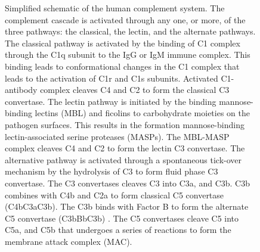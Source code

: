 \documentclass[12pt]{article}
\begin{document}
\begin{figure}[h]
\caption{Simplified schematic of the human complement system. The complement cascade is activated through any one, or more, of the three pathways:  the classical, the lectin, and the alternate pathways. The classical pathway is activated by the binding of C1 complex through the C1q subunit to the IgG or IgM immune complex.  This binding leads to conformational changes in the C1 complex that leads to the activation of C1r and C1s subunits. Activated C1-antibody complex cleaves C4 and C2 to form the classical C3 convertase. The lectin pathway is initiated by the binding mannose-binding lectins (MBL) and ficolins to carbohydrate moieties on the pathogen surfaces. This results in the formation mannose-binding lectin-associated serine proteases (MASPs). The MBL-MASP complex cleaves C4 and C2 to form the lectin C3 convertase. The alternative pathway is activated through a spontaneous tick-over mechanism by the hydrolysis of C3 to form fluid phase C3 convertase. The C3 convertases  cleaves C3 into C3a, and C3b. C3b combines with C4b and C2a to form classical C5 convertase (C4bC3aC3b). The C3b binds with Factor B to form the alternate C5 convertase (C3bBbC3b) . The C5 convertases cleave C5 into C5a, and C5b that undergoes a series of reactions to form the membrane attack complex (MAC).}\label{fig-schematic}
\end{figure}
\end{document}
